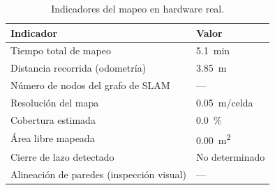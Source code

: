 \begin{table}[H]
\centering
\caption{Indicadores del mapeo en hardware real.}
\label{tab:slam_real_indicadores}
\begin{tabular}{ll}
\hline
\textbf{Indicador} & \textbf{Valor} \\
\hline
Tiempo total de mapeo                  & 5.1~min \\
Distancia recorrida (odometría)        & 3.85~m \\
Número de nodos del grafo de SLAM      & --- \\
Resolución del mapa                    & 0.05~m/celda \\
Cobertura estimada                     & 0.0~\% \\
Área libre mapeada                     & 0.00~m\textsuperscript{2} \\
Cierre de lazo detectado               & No determinado \\
Alineaci\'on de paredes (inspecci\'on visual) & --- \\
\hline
\end{tabular}
\end{table}